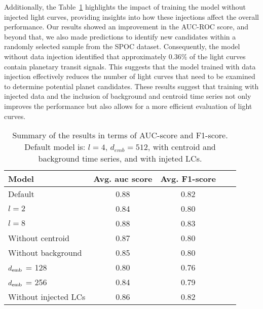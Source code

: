 Additionally, the Table~\ref{tab:summary_results} highlights the impact of training the model without injected light curves, providing insights into how these injections affect the overall performance. Our results showed an improvement in the AUC-ROC score, and beyond that, we also made predictions to identify new candidates within a randomly selected sample from the SPOC dataset. Consequently, the model without data injection identified that approximately 0.36\% of the light curves contain planetary transit signals. This suggests that the model trained with data injection effectively reduces the number of light curves that need to be examined to determine potential planet candidates. These results suggest that training with injected data and the inclusion of background and centroid time series not only improves the performance but also allows for a more efficient evaluation of light curves. \par



\begin{table}
	\centering
	\vspace{5mm}
	\caption{Summary of the results in terms of AUC-score and F1-score. Default model is: $l = 4$, $d_{emb} = 512$, with centroid and background time series, and with injeted LCs. }
	\label{tab:summary_results}
	\vspace{4mm}
	\begin{tabular}{lcccc} 
		\hline
		Model &  Avg. auc score & Avg. F1-score \\
		\hline
        Default & 0.88 & 0.82  \\
        $l = 2$ & 0.84 & 0.80 \\
        $l = 8$ & 0.88 & 0.83 \\
        Without centroid & 0.87 & 0.80  \\
        Without background & 0.85 & 0.80  \\
        \textnormal{$d_{\textnormal{emb}}$} = 128 & 0.80 & 0.76\\
        \textnormal{$d_{\textnormal{emb}}$} = 256 & 0.84 & 0.79 \\
        Without injected LCs & 0.86 & 0.82 \\
        \hline		
	\end{tabular}
	\vspace{3mm}
\end{table}


